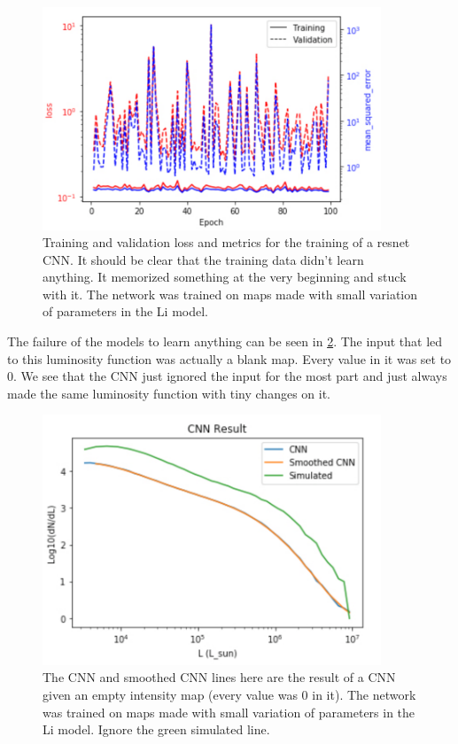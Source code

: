 \documentclass{article}
\begin{document}
		\begin{figure}[H]
			\centering
			\includegraphics[width=0.9\textwidth]{failed_learning.pdf}
			\caption{Training and validation loss and metrics for the training of a resnet CNN.  It should be clear that the training data didn't learn anything.  It memorized something at the very beginning and stuck with it.  The network was trained on maps made with small variation of parameters in the Li model.}
			\label{fig:failed_learning}
		\end{figure}

		The failure of the models to learn anything can be seen in \cref{fig:no_intensity}.  The input that led to this luminosity function was actually a blank map.  Every value in it was set to 0.  We see that the CNN just ignored the input for the most part and just always made the same luminosity function with tiny changes on it.

		\begin{figure}[H]
			\centering
			\includegraphics[width=0.9\textwidth]{no_intensity.pdf}
			\caption{The CNN and smoothed CNN lines here are the result of a CNN given an empty intensity map (every value was 0 in it).  The network was trained on maps made with small variation of parameters in the Li model.  Ignore the green simulated line.}
			\label{fig:no_intensity}
		\end{figure}
\end{document}

